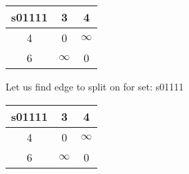 \documentclass[a4paper,10pt]{report} %
\begin{document}
\begin{tabular}[]{|c|c|c|}
\hline
s01111 & 3 & 4\\
\hline
4 &      0 & $\infty$\\
\hline
6 & $\infty$ &      0\\
\hline
\end{tabular}
\newpage


Let us find edge to split on for set: s01111\\
\begin{flushleft}\begin{tabular}[]{|c|c|c|}
\hline
s01111 & 3 & 4\\
\hline
4 &      0 & $\infty$\\
\hline
6 & $\infty$ &      0\\
\hline
\end{tabular}
\end{flushleft}



\newpage
\end{document}
